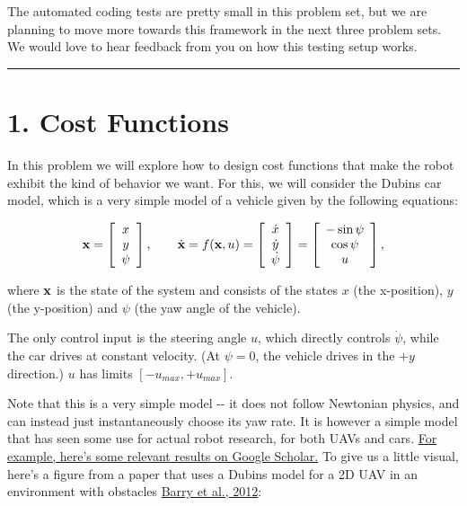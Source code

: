 \documentclass[11pt]{article}
\begin{document}
The automated coding tests are pretty small in this problem set, but we
are planning to move more towards this framework in the next three
problem sets. We would love to hear feedback from you on how this
testing setup works.

\begin{center}\rule{0.5\linewidth}{\linethickness}\end{center}

    \section{1. Cost Functions}\label{cost-functions}

In this problem we will explore how to design cost functions that make
the robot exhibit the kind of behavior we want. For this, we will
consider the Dubins car model, which is a very simple model of a vehicle
given by the following equations:

\[
{\bf{x}} = \left[ \begin{array}{c}
x \\
y \\
\psi \end{array} \right],
\ \ \ \ \ \ 
\dot{{\bf{x}}} = f({\bf{x}},u) = \left[ \begin{array}{c}
\dot x \\
\dot y \\
\dot \psi \end{array} \right] = \left[ \begin{array}{c} - \sin \psi \\
\cos \psi \\
u \end{array} \right],
\]

where \(\bf{x}\) is the state of the system and consists of the states
\(x\) (the x-position), \(y\) (the y-position) and \(\psi\) (the yaw
angle of the vehicle).

The only control input is the steering angle \(u\), which directly
controls \(\dot{\psi}\), while the car drives at constant velocity. (At
\(\psi=0\), the vehicle drives in the \(+y\) direction.) \(u\) has
limits \([-u_{max}, +u_{max}]\).

Note that this is a very simple model -\/- it does not follow Newtonian
physics, and can instead just instantaneously choose its yaw rate. It is
however a simple model that has seen some use for actual robot research,
for both UAVs and cars.
\href{https://scholar.google.com/scholar?hl=en\&as_sdt=0\%2C22\&q=dubins+path+planning\&btnG=}{For
example, here's some relevant results on Google Scholar.} To give us a
little visual, here's a figure from a paper that uses a Dubins model for
a 2D UAV in an environment with obstacles
\href{http://groups.csail.mit.edu/robotics-center/public_papers/Barry12.pdf}{Barry
et al., 2012}:
\end{document}
